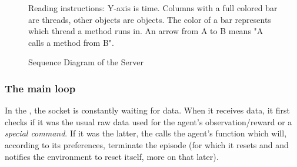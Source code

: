 
\begin{figure}[h!]
	\centering
	\resizebox{1.1\textwidth}{!}{
		
	}
	\caption{Sequence Diagram of the Server}
	\label{fig:sequenceserver}
	\medskip
	\scriptsize
	Reading instructions: Y-axis is time. Columns with a full colored bar are threads, other objects are objects. The color of a bar represents which thread a method runs in. An arrow from A to B means "A calls a method from B". %
\end{figure}

\subsubsection{The main loop}

In the , the socket is constantly waiting for data. When it receives data, it first checks if it was the usual raw data used for the agent's observation/reward or a \textit{special command}. If it was the latter, the  calls the agent's function  which will, according to its preferences, terminate the episode (for which it resets  and  and notifies the environment to reset itself, more on that later). 

